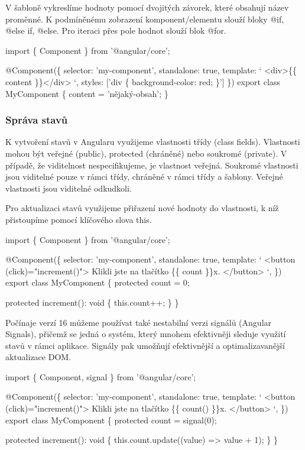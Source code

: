 V šabloně vykreslíme hodnoty pomocí dvojitých závorek, které obsahují název proměnné. K podmíněnému zobrazení komponent/elementu slouží bloky @if, @else if, @else. 
Pro iteraci přes pole hodnot slouží blok @for.\cite{angulardev}

\begin{prog}
import \{ Component \} from '@angular/core';

@Component(\{
  selector: 'my-component',
  standalone: true,
  template: `
    <div>\{\{ content \}\}</div>
  `,
  styles: ['div \{ background-color: red; \}']
\})
export class MyComponent \{
  content = 'nějaký-obsah';
\}
\end{prog}

\subsubsection{Správa stavů}

K vytvoření stavů v Angularu využijeme vlastnosti třídy (class fields). Vlastnosti mohou být veřejné (public), protected (chráněné) nebo soukromé (private). 
V případě, že viditelnost nespecifikujeme, je vlastnost veřejná. Soukromé vlastnosti jsou viditelné pouze v rámci třídy, chráněné v rámci třídy a šablony. 
Veřejné vlastnosti jsou viditelné odkudkoli.\cite{angulardev,learningangular}

Pro aktualizaci stavů využijeme přiřazení nové hodnoty do vlastnosti, k níž přistoupíme pomocí klíčového slova this.\cite{angulardev}

\begin{prog}
import \{ Component \} from '@angular/core';

@Component(\{
  selector: 'my-component',
  standalone: true,
  template: `
    <button (click)="increment()">
      Klikli jste na tlačítko \{\{ count \}\}x.
    </button>
  `,
\})
export class MyComponent \{
  protected count = 0;

  protected increment(): void \{
    this.count++;
  \}
\}
\end{prog}

Počínaje verzí 16 můžeme používat také nestabilní verzi signálů (Angular Signals), přičemž se jedná o systém, který mnohem efektivněji sleduje využití stavů v rámci aplikace. 
Signály pak umožňují efektivnější a optimalizavanější aktualizace DOM. 

\begin{prog}
import \{ Component, signal \} from '@angular/core';

@Component(\{
  selector: 'my-component',
  standalone: true,
  template: `
    <button (click)="increment()">
      Klikli jste na tlačítko \{\{ count() \}\}x.
    </button>
  `,
\})
export class MyComponent \{
  protected count = signal(0);

  protected increment(): void \{
    this.count.update((value) => value + 1);
  \}
\}
\end{prog}

